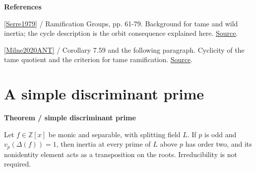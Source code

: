 \documentclass[11pt,a4paper,oneside,openany]{book}
\newenvironment{sources}{\par\smallskip\begingroup\footnotesize\color{atlasgray}\leftskip=10pt\setlength{\parskip}{2pt}}{\par\endgroup\smallskip}
\begin{document}
\begin{sources}
\textbf{References}\par\smallskip
\noindent\hyperlink{ref:Serre1979}{[Serre1979]} / Ramification Groups, pp. 61-79. Background for tame and wild inertia; the cycle description is the orbit consequence explained here. \href{https://link.springer.com/book/10.1007/978-1-4757-5673-9}{Source}.\par
\noindent\hyperlink{ref:Milne2020ANT}{[Milne2020ANT]} / Corollary 7.59 and the following paragraph. Cyclicity of the tame quotient and the criterion for tame ramification. \href{https://www.jmilne.org/math/CourseNotes/ANT.pdf}{Source}.\par
\end{sources}\color{black}
\section{A simple discriminant prime}

\begin{atlasblock}[standard]
\textbf{\sffamily Theorem  /  simple discriminant prime}\par\smallskip
\color{black} Let \(f\in\mathbb Z[x]\) be monic and separable, with splitting field \(L\). If \(p\) is odd and \(v_p(\Delta(f))=1\), then inertia at every prime of \(L\) above \(p\) has order two, and its nonidentity element acts as a transposition on the roots. Irreducibility is not required.\par
\end{atlasblock}\color{black}
\end{document}
